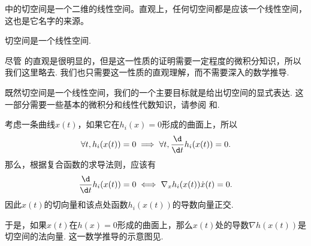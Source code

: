  中的切空间是一个二维的线性空间。直观上，任何切空间都是应该一个线性空间，这也是它名字的来源。
\begin{lemma}\label{lemma:tan-space}
    切空间是一个线性空间. 
\end{lemma}

尽管 的直观是很明显的，但是这一性质的证明需要一定程度的微积分知识，所以我们这里略去. 我们也只需要这一性质的直观理解，而不需要深入的数学推导.

既然切空间是一个线性空间，我们的一个主要目标就是给出切空间的显式表达. 这一部分需要一些基本的微积分和线性代数知识，请参阅 和.

考虑一条曲线$x(t)$，如果它在$h_i(x)=0$形成的曲面上，所以
\[\forall t,h_i(x(t))=0\implies\forall t, \frac{\d}{\d t}h_i(x(t))=0.\]
那么，根据复合函数的求导法则，应该有
\[\frac{\d}{\d t}h_i(x(t))=0\iff \nabla_x h_i(x(t))\dot{x}(t)=0.\]
因此$x(t)$的切向量和该点处函数$h_i(x(t))$的导数向量正交. 

于是，如果$x(t)$在$h(x)=0$形成的曲面上，那么$x(t)$处的导数$\nabla h(x(t))$是切空间的法向量. 这一数学推导的示意图见.


